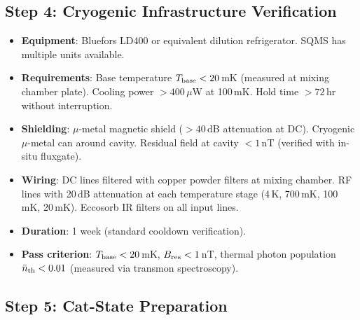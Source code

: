 \documentclass[11pt]{article}
\theoremstyle{definition}
\theoremstyle{remark}
\begin{document}
\subsection{Step 4: Cryogenic Infrastructure Verification}

\begin{itemize}[nosep]
\item \textbf{Equipment}: Bluefors LD400 or equivalent dilution
  refrigerator. SQMS has multiple units available.
\item \textbf{Requirements}: Base temperature $T_{\rm base} < 20$\,mK
  (measured at mixing chamber plate). Cooling power $> 400\,\mu$W at
  100\,mK. Hold time $> 72$\,hr without interruption.
\item \textbf{Shielding}: $\mu$-metal magnetic shield ($> 40$\,dB
  attenuation at DC). Cryogenic $\mu$-metal can around cavity.
  Residual field at cavity $< 1$\,nT (verified with in-situ fluxgate).
\item \textbf{Wiring}: DC lines filtered with copper powder filters at
  mixing chamber. RF lines with 20\,dB attenuation at each temperature
  stage (4\,K, 700\,mK, 100\,mK, 20\,mK). Eccosorb IR filters on all
  input lines.
\item \textbf{Duration}: 1 week (standard cooldown verification).
\item \textbf{Pass criterion}: $T_{\rm base} < 20$\,mK, $B_{\rm res} < 1$\,nT,
  thermal photon population $\bar{n}_{\rm th} < 0.01$ (measured via
  transmon spectroscopy).
\end{itemize}

\subsection{Step 5: Cat-State Preparation}
\end{document}
